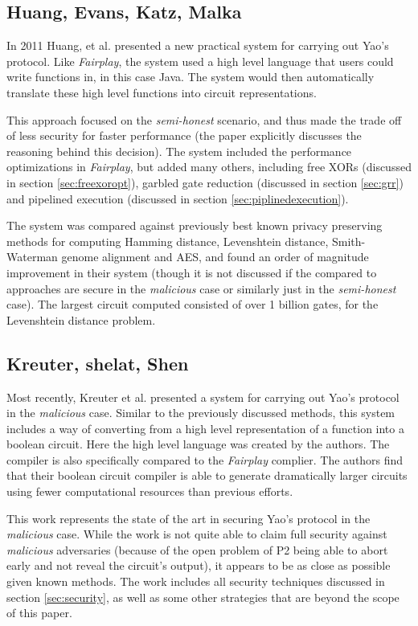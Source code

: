 \subsection{Huang, Evans, Katz, Malka}

In 2011 Huang, et al.\cite{huang2011faster} presented a new practical system for carrying out Yao's protocol.  Like \emph{Fairplay}, the system used a high level language that users could write functions in, in this case Java.  The system would then automatically translate these high level functions into circuit representations.

This approach focused on the \emph{semi-honest} scenario, and thus made the trade off of less security for faster performance (the paper explicitly discusses the reasoning behind this decision). The system included the performance optimizations in \emph{Fairplay}, but added many others, including free XORs (discussed in section \ref{sec:freexoropt}), garbled gate reduction (discussed in section \ref{sec:grr}) and pipelined execution (discussed in section \ref{sec:piplinedexecution}).

The system was compared against previously best known privacy preserving methods for computing Hamming distance, Levenshtein distance, Smith-Waterman genome alignment and AES, and found an order of magnitude improvement in their system (though it is not discussed if the compared to approaches are secure in the \emph{malicious} case or similarly just in the \emph{semi-honest} case). The largest circuit computed consisted of over 1 billion gates, for the Levenshtein distance problem.


\subsection{Kreuter, shelat, Shen}

Most recently, Kreuter et al.\cite{kreuter2012billion} presented a system for carrying out Yao's protocol in the \emph{malicious} case.  Similar to the previously discussed methods, this system includes a way of converting from a high level representation of a function into a boolean circuit.  Here the high level language was created by the authors.  The compiler is also specifically compared to the \emph{Fairplay} complier.  The authors find that their boolean circuit compiler is able to generate dramatically larger circuits using fewer computational resources than previous efforts.

This work represents the state of the art in securing Yao's protocol in the \emph{malicious} case.  While the work is not quite able to claim full security against \emph{malicious} adversaries (because of the open problem of \ac{P2} being able to abort early and not reveal the circuit's output), it appears to be as close as possible given known methods.  The work includes all security techniques discussed in section \ref{sec:security}, as well as some other strategies that are beyond the scope of this paper.

